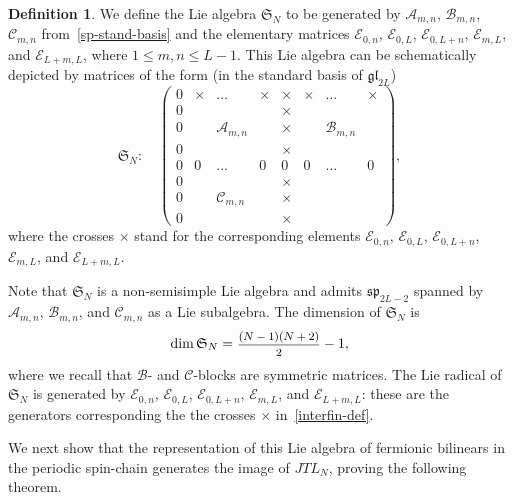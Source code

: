 \documentclass[11pt]{article}
\newcommand{\ffrac}[2]{\mbox{\footnotesize$\displaystyle\frac{#1}{#2}$}}
\newcommand{\JTL}[1]{JTL_{#1}}
\newcommand{\interLie}{\mathfrak{S}}
\newcommand{\interfin}[1]{\interLie_{#1}}
\newcommand{\Asp}{\mathcal{A}}
\newcommand{\Bsp}{\mathcal{B}}
\newcommand{\Csp}{\mathcal{C}}
\newcommand{\Egl}{\mathcal{E}}
\newcommand{\gl}{\mathfrak{gl}}
\newcommand{\ssp}{\mathfrak{sp}}
\theoremstyle{definition}
\newtheorem{dfn}[subsubsection]{Definition}
\begin{document}
\begin{dfn}\label{S_N-def}
We define the  Lie algebra $\interfin{N}$ to be generated by $\Asp_{m,n}$,
$\Bsp_{m,n}$, $\Csp_{m,n}$ from~\eqref{sp-stand-basis} and the elementary matrices
$\Egl_{0,n}$, $\Egl_{0,L}$, $\Egl_{0,L+n}$, $\Egl_{m,L}$, and
$\Egl_{L+m,L}$,
where $1\leq m,n\leq
L-1$. This Lie algebra can be schematically depicted by  matrices
of the form (in the standard basis of $\gl_{2L}$)
\begin{equation}\label{interfin-def}
\interfin{N}:\quad
\begin{pmatrix}
0 &  \times & \dots & \times   & \times  & \times & \dots & \times\\
0 &  &  &            & \times  &   &       & \\
0 &  & \Asp_{m,n} &  & \times  &   & \Bsp_{m,n}    & \\
0 &  &  &            & \times  &   &         & \\
0 & 0 & \dots & 0    & 0  & 0 & \dots & 0 \\
0 &  &  &            & \times  &   &       & \\
0 &  & \Csp_{m,n} &  & \times  &   &     & \\
0 &  &  &            & \times  &   &         &
\end{pmatrix},
\end{equation}
where the crosses $\times$ stand for the corresponding elements
$\Egl_{0,n}$, $\Egl_{0,L}$, $\Egl_{0,L+n}$, $\Egl_{m,L}$, and
$\Egl_{L+m,L}$.
\end{dfn}
Note that $\interfin{N}$ is a non-semisimple Lie algebra and admits
$\ssp_{2L-2}$ spanned by $\Asp_{m,n}$,
$\Bsp_{m,n}$, and $\Csp_{m,n}$ as a Lie subalgebra.  The dimension of $\interfin{N}$ is
\begin{equation}
\dim \interfin{N} = \ffrac{(N-1)(N+2)}{2} -1,
\end{equation}
where we recall that $\Bsp$- and $\Csp$-blocks are symmetric matrices.
The Lie radical of $\interfin{N}$  is generated by $\Egl_{0,n}$, $\Egl_{0,L}$, $\Egl_{0,L+n}$, $\Egl_{m,L}$, and
$\Egl_{L+m,L}$: these are the  generators corresponding the the crosses  $\times$ in~\eqref{interfin-def}.

\medskip
We next show that the representation of this Lie algebra of fermionic bilinears in the periodic spin-chain generates the image of $\JTL{N}$, proving the following theorem.
\end{document}
